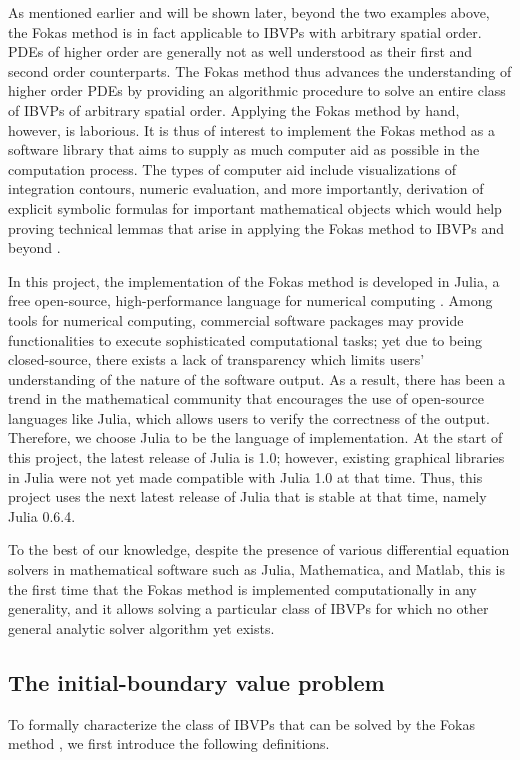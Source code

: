 \documentclass[12pt, oneside, a4paper]{article}
\begin{document}
As mentioned earlier and will be shown later, beyond the two examples above, the Fokas method is in fact applicable to IBVPs with arbitrary spatial order. PDEs of higher order are generally not as well understood as their first and second order counterparts. The Fokas method thus advances the understanding of higher order PDEs by providing an algorithmic procedure to solve an entire class of IBVPs of arbitrary spatial order. Applying the Fokas method by hand, however, is laborious. It is thus of interest to implement the Fokas method as a software library that aims to supply as much computer aid as possible in the computation process. The types of computer aid include visualizations of integration contours, numeric evaluation, and more importantly, derivation of explicit symbolic formulas for important mathematical objects which would help proving technical lemmas that arise in applying the Fokas method to IBVPs \cite{Smith2012} and beyond \cite{Miller2018}.

In this project, the implementation of the Fokas method is developed in Julia, a free open-source, high-performance language for numerical computing \cite{julia}. Among tools for numerical computing, commercial software packages may provide functionalities to execute sophisticated computational tasks; yet due to being closed-source, there exists a lack of transparency which limits users' understanding of the nature of the software output. As a result, there has been a trend in the mathematical community that encourages the use of open-source languages like Julia, which allows users to verify the correctness of the output. Therefore, we choose Julia to be the language of implementation. At the start of this project, the latest release of Julia is 1.0; however, existing graphical libraries in Julia were not yet made compatible with Julia 1.0 at that time. Thus, this project uses the next latest release of Julia that is stable at that time, namely Julia 0.6.4. 

To the best of our knowledge, despite the presence of various differential equation solvers in mathematical software such as Julia, Mathematica, and Matlab, this is the first time that the Fokas method is implemented computationally in any generality, and it allows solving a particular class of IBVPs for which no other general analytic solver algorithm yet exists.

\subsection{The initial-boundary value problem}\label{sec:IBVP}
To formally characterize the class of IBVPs that can be solved by the Fokas method \cite[p.9]{Smith2016}, we first introduce the following definitions.
\end{document}
